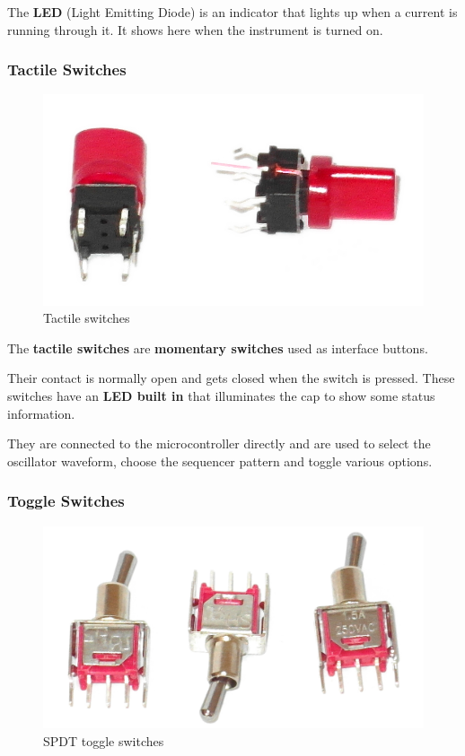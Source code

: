 \documentclass{scrartcl}
\begin{document}
The \textbf{LED} (Light Emitting Diode) is an indicator that lights up when a current is running through it.
It shows here when the instrument is turned on.

\subsubsection{Tactile Switches}

\begin{figure}[!ht]
    \begin{center}
        \includegraphics[scale=0.20]{assets/zekit-tacts.jpg}
        \caption{Tactile switches}
    \end{center}
\end{figure}

The \textbf{tactile switches} are \textbf{momentary switches} used as interface buttons.

Their contact is normally open and gets closed when the switch is pressed. These switches have an \textbf{LED built in} that illuminates the cap to show some status information.

They are connected to the microcontroller directly and are used to select the oscillator waveform, choose the sequencer pattern and toggle various options.

\subsubsection{Toggle Switches}

\begin{figure}[!ht]
    \begin{center}
        \includegraphics[scale=0.16]{assets/zekit-toggles.jpg}
        \caption{SPDT toggle switches}
    \end{center}
\end{figure}
\end{document}
